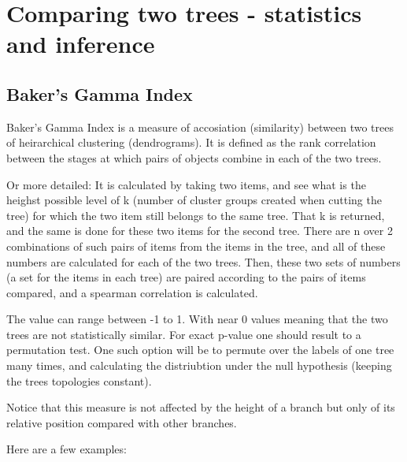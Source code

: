 \documentclass[shortnames,nojss,article]{jss}\usepackage[]{graphicx}\usepackage[]{color}
\begin{document}
\section{Comparing two trees - statistics and inference}

\subsection{Baker's Gamma Index}

Baker's Gamma Index \citep{baker1974stability} is a measure of accosiation (similarity) 
between two trees of heirarchical clustering (dendrograms). It is defined as the rank correlation between the stages at which pairs of objects combine in each of the two trees.

Or more detailed: It is calculated by taking two items, and see what is the heighst
possible level of k (number of cluster groups created when cutting the tree)
for which the two item still belongs to the same tree. That k is returned, 
and the same is done for these two items for the second tree.
There are n over 2 combinations of such pairs of items from the items in 
the tree, and all of these numbers are calculated for each of the two trees. 
Then, these two sets of numbers (a set for the items in each tree)
are paired according to the pairs of items compared, and a spearman 
correlation is calculated.

The value can range between -1 to 1. With near 0 values meaning that
the two trees are not statistically similar.
For exact p-value one should result to a permutation test. One such option
will be to permute over the labels of one tree many times, and calculating 
the distriubtion under the null hypothesis (keeping the trees topologies
constant).

Notice that this measure is not affected by the height of a branch but only
of its relative position compared with other branches.


Here are a few examples:
\end{document}
